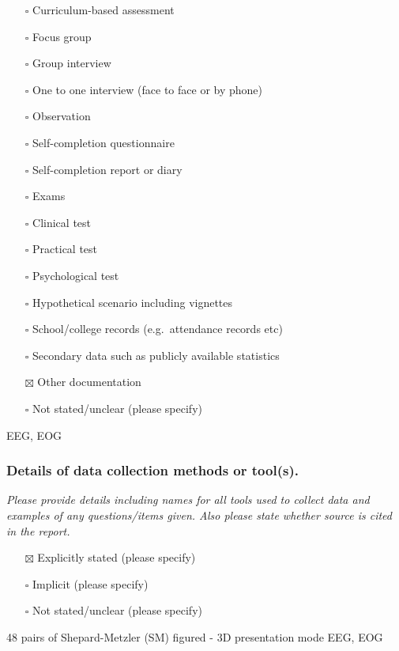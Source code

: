 \documentclass[
  doc, a4paper]{apa7}
\providecommand{\tightlist}{%
  \setlength{\itemsep}{0pt}\setlength{\parskip}{0pt}}
\begin{document}
\begin{itemize}
\tightlist
\item[$\square$]
  Curriculum-based assessment
\item[$\square$]
  Focus group
\item[$\square$]
  Group interview
\item[$\square$]
  One to one interview (face to face or by phone)
\item[$\square$]
  Observation
\item[$\square$]
  Self-completion questionnaire
\item[$\square$]
  Self-completion report or diary
\item[$\square$]
  Exams
\item[$\square$]
  Clinical test
\item[$\square$]
  Practical test
\item[$\square$]
  Psychological test
\item[$\square$]
  Hypothetical scenario including vignettes
\item[$\square$]
  School/college records (e.g.~attendance records etc)
\item[$\square$]
  Secondary data such as publicly available statistics
\item[$\boxtimes$]
  Other documentation
\item[$\square$]
  Not stated/unclear (please specify)
\end{itemize}

EEG, EOG

\subsubsection{Details of data collection methods or tool(s).}\label{details-of-data-collection-methods-or-tools.}

\emph{Please provide details including names for all tools used to collect data and examples of any questions/items given. Also please state whether source is cited in the report.}

\begin{itemize}
\tightlist
\item[$\boxtimes$]
  Explicitly stated (please specify)
\item[$\square$]
  Implicit (please specify)
\item[$\square$]
  Not stated/unclear (please specify)
\end{itemize}

48 pairs of Shepard-Metzler (SM) figured - 3D presentation mode
EEG, EOG
\end{document}
